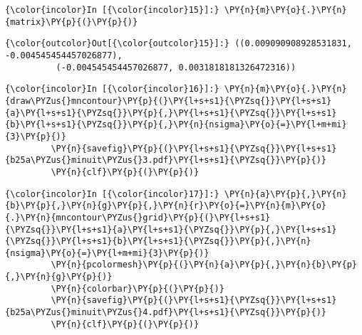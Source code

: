     \begin{Verbatim}[commandchars=\\\{\}]
{\color{incolor}In [{\color{incolor}15}]:} \PY{n}{m}\PY{o}{.}\PY{n}{matrix}\PY{p}{(}\PY{p}{)}
\end{Verbatim}


\begin{Verbatim}[commandchars=\\\{\}]
{\color{outcolor}Out[{\color{outcolor}15}]:} ((0.009090908928531831, -0.004545454457026877),
          (-0.004545454457026877, 0.0031818181326472316))
\end{Verbatim}
            
    \begin{Verbatim}[commandchars=\\\{\}]
{\color{incolor}In [{\color{incolor}16}]:} \PY{n}{m}\PY{o}{.}\PY{n}{draw\PYZus{}mncontour}\PY{p}{(}\PY{l+s+s1}{\PYZsq{}}\PY{l+s+s1}{a}\PY{l+s+s1}{\PYZsq{}}\PY{p}{,}\PY{l+s+s1}{\PYZsq{}}\PY{l+s+s1}{b}\PY{l+s+s1}{\PYZsq{}}\PY{p}{,}\PY{n}{nsigma}\PY{o}{=}\PY{l+m+mi}{3}\PY{p}{)}
         \PY{n}{savefig}\PY{p}{(}\PY{l+s+s1}{\PYZsq{}}\PY{l+s+s1}{b25a\PYZus{}minuit\PYZus{}3.pdf}\PY{l+s+s1}{\PYZsq{}}\PY{p}{)}
         \PY{n}{clf}\PY{p}{(}\PY{p}{)}
\end{Verbatim}


    \begin{Verbatim}[commandchars=\\\{\}]
{\color{incolor}In [{\color{incolor}17}]:} \PY{n}{a}\PY{p}{,}\PY{n}{b}\PY{p}{,}\PY{n}{g}\PY{p}{,}\PY{n}{r}\PY{o}{=}\PY{n}{m}\PY{o}{.}\PY{n}{mncontour\PYZus{}grid}\PY{p}{(}\PY{l+s+s1}{\PYZsq{}}\PY{l+s+s1}{a}\PY{l+s+s1}{\PYZsq{}}\PY{p}{,}\PY{l+s+s1}{\PYZsq{}}\PY{l+s+s1}{b}\PY{l+s+s1}{\PYZsq{}}\PY{p}{,}\PY{n}{nsigma}\PY{o}{=}\PY{l+m+mi}{3}\PY{p}{)}
         \PY{n}{pcolormesh}\PY{p}{(}\PY{n}{a}\PY{p}{,}\PY{n}{b}\PY{p}{,}\PY{n}{g}\PY{p}{)}
         \PY{n}{colorbar}\PY{p}{(}\PY{p}{)}
         \PY{n}{savefig}\PY{p}{(}\PY{l+s+s1}{\PYZsq{}}\PY{l+s+s1}{b25a\PYZus{}minuit\PYZus{}4.pdf}\PY{l+s+s1}{\PYZsq{}}\PY{p}{)}
         \PY{n}{clf}\PY{p}{(}\PY{p}{)}
\end{Verbatim}


